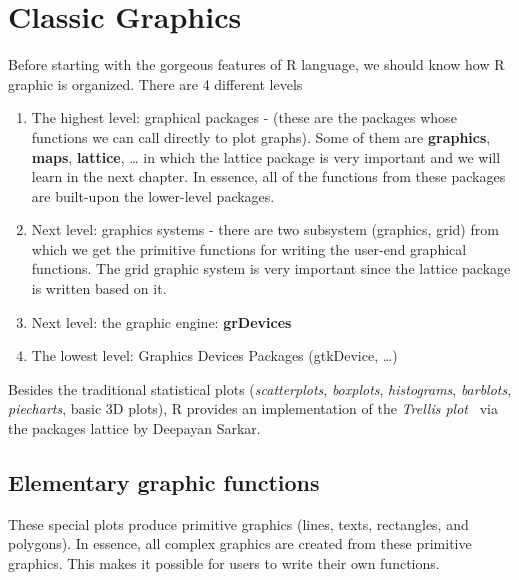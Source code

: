 
\chapter{Classic Graphics}
\label{chap:classic-graphics}

Before starting with the gorgeous features of R language, we should
know how R graphic is organized. There are 4 different levels 
\begin{enumerate}
\item The highest level: graphical packages - (these are the packages
  whose functions we can call directly to plot graphs). Some of them
  are {\bf graphics}, {\bf maps}, {\bf lattice}, … in which the lattice package is
  very important and we will learn in the next chapter. In essence,
  all of the functions from these packages are built-upon the
  lower-level packages.

\item Next level: graphics systems - there are two subsystem
  (graphics, grid) from which we get the primitive functions for
  writing the user-end graphical functions. The grid graphic system is
  very important since the lattice package is written based on it. 

\item Next level: the graphic engine: {\bf grDevices}

\item The lowest level: Graphics Devices Packages (gtkDevice, …)

\end{enumerate}
Besides the traditional statistical plots ({\it scatterplots},
{\it boxplots}, {\it histograms}, {\it barblots}, {\it piecharts},
basic 3D plots), R provides an implementation of the
{\it Trellis plot}~\cite{becker1996vdc} via the packages lattice by
Deepayan Sarkar.

\section{Elementary graphic functions}
\label{sec:elem-graph-funct}

These special plots produce primitive graphics (lines, texts,
rectangles, and polygons). In essence, all complex graphics are
created from these primitive graphics. This makes it possible for
users to write their own functions.

